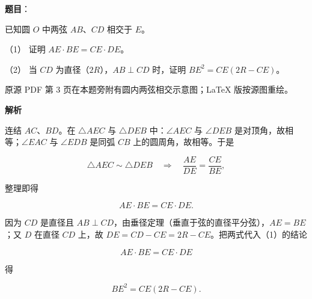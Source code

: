 \begin{answer}

\textbf{题目}：

已知圆 $O$ 中两弦 $AB$、$CD$ 相交于 $E$。

（1） 证明 $AE\cdot BE=CE\cdot DE$。

（2） 当 $CD$ 为直径（$2R$），$AB\perp CD$ 时，证明 $BE^2=CE(2R-CE)$。

\begin{gktip}
原源 PDF 第 3 页在本题旁附有圆内两弦相交示意图；LaTeX 版按源图重绘。
\end{gktip}
\nopagebreak[4]
\begin{center}\end{center}
\nopagebreak[4]
\textbf{解析}
\nopagebreak[4]
\begin{center}\end{center}
\nopagebreak[4]

连结 $AC$、$BD$。在 $\triangle AEC$ 与 $\triangle DEB$ 中：$\angle AEC$ 与 $\angle DEB$ 是对顶角，故相等；$\angle EAC$ 与 $\angle EDB$ 是同弧 $CB$ 上的圆周角，故相等。于是

\nopagebreak[4]
\[
\triangle AEC\sim\triangle DEB
\quad\Longrightarrow\quad
\frac{AE}{DE}=\frac{CE}{BE},
\]

整理即得

\nopagebreak[4]
\[
AE\cdot BE=CE\cdot DE.
\]


因为 $CD$ 是直径且 $AB\perp CD$，由垂径定理（垂直于弦的直径平分弦），$AE=BE$；又 $D$ 在直径 $CD$ 上，故 $DE=CD-CE=2R-CE$。把两式代入（1）的结论

\nopagebreak[4]
\[
AE\cdot BE=CE\cdot DE
\]

得

\nopagebreak[4]
\[
BE^2=CE(2R-CE).
\]



\end{answer}
